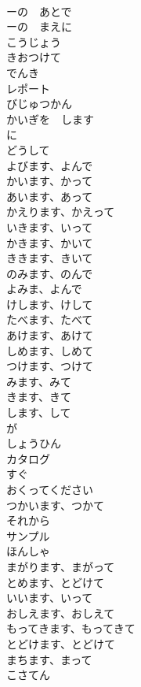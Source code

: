 \documentclass[8pt]{extreport}
\begin{document}
\begin{CJK}{UTF8}{min}
\\	ーの　あとで		
\\	ーの　まえに		
\\	こうじょう		
\\	きおつけて		
\\	でんき		
\\	レポート		
\\	びじゅつかん		
\\	かいぎを　します		
\\	に		
\\	どうして		
\\	よびます、よんで		
\\	かいます、かって		
\\	あいます、あって		
\\	かえります、かえって		
\\	いきます、いって
\\	かきます、かいて		
\\	ききます、きいて		
\\	のみます、のんで		
\\	よみま、よんで		
\\	けします、けして		
\\	たべます、たべて		
\\	あけます、あけて		
\\	しめます、しめて		
\\	つけます、つけて		
\\	みます、みて		
\\	きます、きて		
\\	します、して		
\\	が		
\\	しょうひん		
\\	カタログ		
\\	すぐ		
\\	おくってください		
\\	つかいます、つかて		
\\	それから		
\\	サンプル		
\\	ほんしゃ		
\\	まがります、まがって		
\\	とめます、とどけて		
\\	いいます、いって		
\\	おしえます、おしえて		
\\	もってきます、もってきて		
\\	とどけます、とどけて		
\\	まちます、まって		
\\	こさてん		

\end{CJK}
\end{document}
